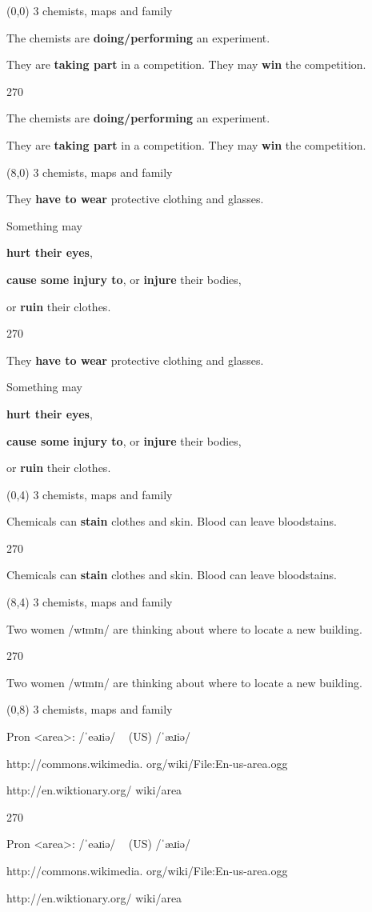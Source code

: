 \documentclass[a4paper]{article}
\newenvironment{itemize*}%
{\begin{itemize}%
 \setlength{\itemsep}{0.0cm}%
 \setlength{\parsep}{0pt}%
 \setlength{\parskip}{0pt}}%
{\end{itemize}}
\newcommand{\mycard}[3]{%
	\small #1 #2
	\par
	\parbox[t][6.8cm][c]{9.5cm}{%
	\par
	\myleft{#3}
	\par
	\myright{#3}
	}
}
\newcommand{\myleft}[1]{%
	\begin{sideways}
	\hspace*{-0.9cm}
		\parbox[t][2.7cm][t]{6.5cm}{%
		\Large #1
		}
	\end{sideways}
}
\newcommand{\myright}[1]{%
	\hspace*{6.5cm}
	\begin{turn}{270}
	\hspace*{-7.1cm}
		\parbox[t][2.7cm][t]{6.5cm}{%
		\Large #1
		}
	\end{turn}
}
\begin{document}
\begin{textblock}{8}(0,0)
\mycard{3}{chemists, maps and family}{
\begin{itemize*}
\item The chemists are \textbf{doing/performing} an experiment.
\item They are \textbf{taking part} in a competition. They may \textbf{win} the competition.
\end{itemize*}
}
\end{textblock}

\begin{textblock}{8}(8,0)
\mycard{3}{chemists, maps and family}{
\large
\begin{itemize*}
\item They \textbf{have to wear} protective clothing and glasses.
\item Something may
\begin{itemize*}
\item \textbf{hurt their eyes},
\item \textbf{cause some injury to}, or \textbf{injure} their bodies,
\item or \textbf{ruin} their clothes.
\end{itemize*}
\end{itemize*}
}
\end{textblock}

\begin{textblock}{8}(0,4)
\mycard{3}{chemists, maps and family}{
\begin{itemize*}
\item Chemicals can \textbf{stain} clothes and skin. Blood can leave bloodstains.
\end{itemize*}
}
\end{textblock}

\begin{textblock}{8}(8,4)
\mycard{3}{chemists, maps and family}{
\begin{itemize*}
\item Two women /wɪmɪn/ are thinking about where to locate a new building.
\end{itemize*}
}
\end{textblock}

\begin{textblock}{8}(0,8)
\mycard{3}{chemists, maps and family}{
\begin{itemize*}
\item Pron <area>: /ˈeəɹiə/ ~ (US) /ˈæɹiə/
\item http://commons.wikimedia.
org/wiki/File:En-us-area.ogg
\item http://en.wiktionary.org/
wiki/area
\end{itemize*}
}
\end{textblock}
\end{document}
